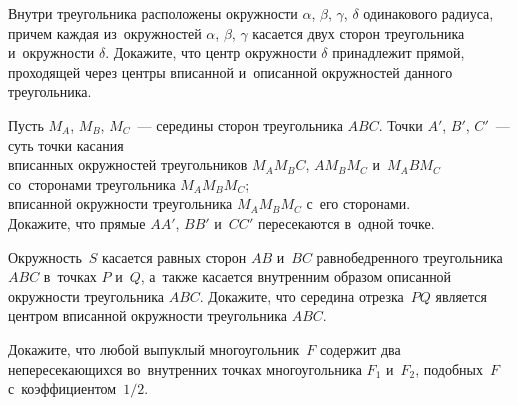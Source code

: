 \begin{problems}
\item
Внутри треугольника расположены окружности
$\alpha$, $\beta$, $\gamma$, $\delta$ одинакового радиуса, причем каждая
из~окружностей $\alpha$, $\beta$, $\gamma$ касается двух сторон треугольника
и~окружности $\delta$.
Докажите, что центр окружности $\delta$ принадлежит прямой, проходящей через
центры вписанной и~описанной окружностей данного треугольника.

\item
Пусть $M_A$, $M_B$, $M_C$~--- середины сторон треугольника $ABC$.
Точки $A'$, $B'$, $C'$~--- суть точки касания
\\
\sp
вписанных окружностей треугольников $M_A M_B C$, $A M_B M_C$ и~$M_A B M_C$
со~сторонами треугольника $M_A M_B M_C$;
\\
\sp
вписанной окружности треугольника $M_A M_B M_C$ с~его сторонами.
\\
Докажите, что прямые $AA'$, $BB'$ и~$CC'$ пересекаются в~одной точке.

\item
Окружность~$S$ касается равных сторон $AB$ и~$BC$ равнобедренного
треугольника $ABC$ в~точках $P$ и~$Q$, а~также касается внутренним образом
описанной окружности треугольника $ABC$.
Докажите, что середина отрезка~$PQ$ является центром вписанной окружности
треугольника $ABC$.


\item
Докажите, что любой выпуклый многоугольник~$F$ содержит два непересекающихся
во~внутренних точках многоугольника $F_1$ и~$F_2$, подобных~$F$
с~коэффициентом~$1 / 2$.


\end{problems}

\endgroup %

